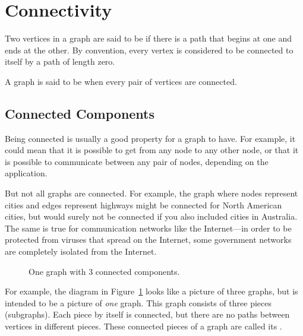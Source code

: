 \section{Connectivity}

\begin{definition}
  Two vertices in a graph are said to be  if there
  is a path that begins at one and ends at the other.  By convention,
  every vertex is considered to be connected to itself by a path of
  length zero.
\end{definition}

\begin{definition}\label{def:connected-graph}
A graph is said to be  when every pair of vertices are
connected.
\end{definition}

\subsection{Connected Components}

Being connected is usually a good property for a graph to have.  For
example, it could mean that it is possible to get from any node to any
other node, or that it is possible to communicate between any pair of
nodes, depending on the application.

But not all graphs are connected.  For example, the graph where nodes
represent cities and edges represent highways might be connected for
North American cities, but would surely not be connected if you also
included cities in Australia.  The same is true for communication
networks like the Internet---in order to be protected from viruses
that spread on the Internet, some government networks are completely
isolated from the Internet.

\begin{figure}[htbp]


\caption{One graph with 3 connected components.}

\label{fig:3comp}
\end{figure}

For example, the diagram in Figure~\ref{fig:3comp} looks like a
picture of three graphs, but is intended to be a picture of \emph{one}
graph.  This graph consists of three pieces (subgraphs).  Each piece
by itself is connected, but there are no paths between vertices in
different pieces.  These connected pieces of a graph are called its
.

